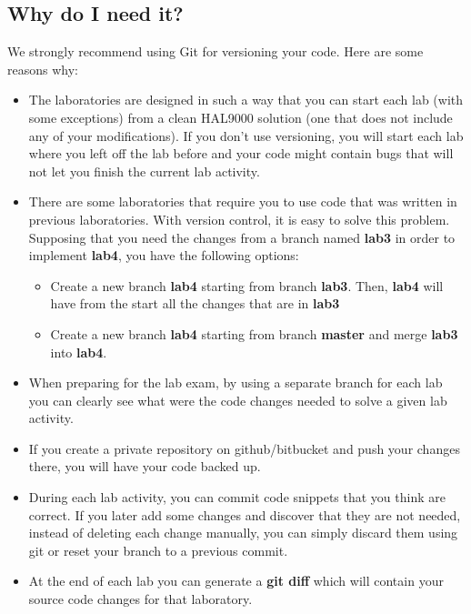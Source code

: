\begin{appendices}
\subsection{Why do I need it?}
We strongly recommend using Git for versioning your code.
Here are some reasons why:
\begin{itemize}
	\item The laboratories are designed in such a way that you can start each lab (with some exceptions) from a clean HAL9000 solution (one that does not include any of your modifications). 
		 If you don't use versioning, you will start each lab where you left off the lab before and your code might contain bugs that will not let you finish the current lab activity.
        \item There are some laboratories that require you to use code that was written in previous laboratories. 
                With version control, it is easy to solve this problem. Supposing that you need the changes from a branch named \textbf{lab3} in order to implement \textbf{lab4}, you have the following options:
		\begin{itemize}
			\item Create a new branch \textbf{lab4} starting from branch \textbf{lab3}. Then, \textbf{lab4} will have from the start all the changes that are in \textbf{lab3}
			\item Create a new branch \textbf{lab4} starting from branch \textbf{master} and merge \textbf{lab3} into \textbf{lab4}.
		\end{itemize}
	\item When preparing for the lab exam, by using a separate branch for each lab you can clearly see what were the code changes needed to solve a given lab activity.
	\item If you create a private repository on github/bitbucket and push your changes there, you will have your code backed up.
	\item During each lab activity, you can commit code snippets that you think are correct. If you later add some changes and discover that they are not needed, instead of deleting each change manually, you can simply discard them using git or reset your branch to a previous commit.
	\item At the end of each lab you can generate a \textbf{git diff} which will contain your source code changes for that laboratory.
\end{itemize}


\end{appendices}
